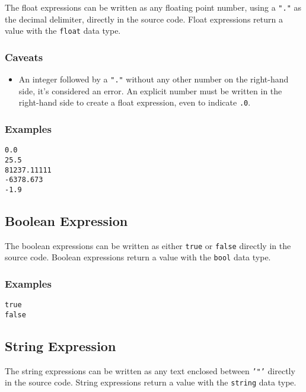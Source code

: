 The float expressions can be written as any floating point number, using a \texttt{"."} as the decimal delimiter, directly in the source code.
Float expressions return a value with the \texttt{float} data type.

\subsubsection{Caveats}

\begin{itemize}
    \item An integer followed by a \texttt{"."} without any other number on the right-hand side, it's considered an error. An explicit number
        must be written in the right-hand side to create a float expression, even to indicate \texttt{.0}.
\end{itemize}

\subsubsection{Examples}

\begin{lstlisting}
0.0
25.5
81237.11111
-6378.673
-1.9
\end{lstlisting}

\subsection{Boolean Expression}

The boolean expressions can be written as either \texttt{true} or \texttt{false} directly in the source code.
Boolean expressions return a value with the \texttt{bool} data type.

\subsubsection{Examples}

\begin{lstlisting}
true
false
\end{lstlisting}

\subsection{String Expression}

The string expressions can be written as any text enclosed between \texttt{'"'} directly in the source code.
String expressions return a value with the \texttt{string} data type.

